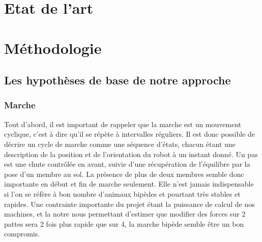 \documentclass[journal, a4paper]{IEEEtran}
\begin{document}

\section{Etat de l'art}\label{sec:etat-de-l'art}



\section{Méthodologie}\label{sec:met}
	\subsection{Les hypothèses de base de notre approche}\label{subsec:les-hypotheses-de-base-de-notre-approche}


	\subsubsection{Marche}
	Tout d'abord, il est important de rappeler que la marche est un
	mouvement cyclique, c'est à dire qu'il se répète à intervalles
	réguliers. Il est donc possible de décrire un cycle de marche
	comme une séquence d'états, chacun étant une description de la
	position et de l'orientation du robot à un instant donné.
	Un pas est une chute contrôlée en avant, suivie d'une récupération
	de l'équilibre par la pose d'un membre au sol.
	La présence de plus de deux membres semble donc importante en début
	et fin de marche seulement. Elle n'est jamais indispensable si l'on
	se réfère à bon nombre d'animaux bipèdes et pourtant très stables et
	rapides.
	Une contrainte importante du projet étant la puissance de calcul
	de nos machines, et la notre nous permettant d'estimer que
	modifier des forces sur 2 pattes sera 2 fois plus rapide que sur 4,
	la marche bipède semble être un bon compromis.
\end{document}
